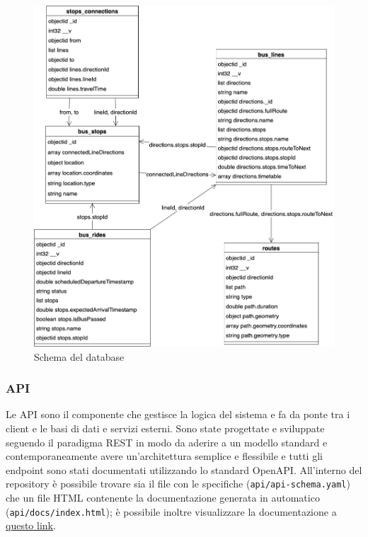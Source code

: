 \begin{figure}[H]
    \centering
    \includegraphics[width=1\linewidth]{images/database_schema.png}
    \caption{Schema del database}
    \label{fig:database-schema}
\end{figure}


\subsubsection{API}

Le API sono il componente che gestisce la logica del sistema e fa da ponte tra i client e le basi di dati e servizi esterni.
Sono state progettate e sviluppate seguendo il paradigma REST in modo da aderire a un modello standard e contemporaneamente avere un'architettura semplice e flessibile e tutti gli endpoint sono stati documentati utilizzando lo standard OpenAPI.
All'interno del repository è possibile trovare sia il file con le specifiche (\verb|api/api-schema.yaml|) che un file HTML contenente la documentazione generata in automatico (\verb|api/docs/index.html|); è possibile inoltre visualizzare la documentazione a \href{https://htmlpreview.github.io/?https://raw.githubusercontent.com/bambinim/CityBus/refs/heads/main/api/docs/index.html}{questo link}.


